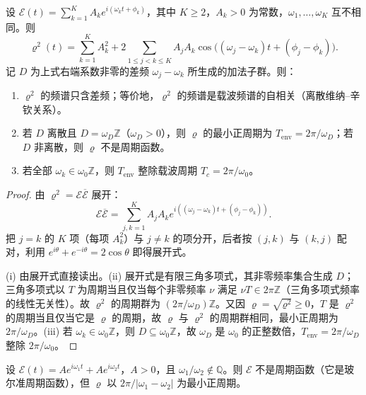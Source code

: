 \begin{theorem}[差频展开]\label{thm:dyn_envelope_difference}
设 $\mathcal E(t)=\sum_{k=1}^{K}A_ke^{i(\omega_kt+\phi_k)}$，其中 $K\ge2$，$A_k>0$ 为常数，$\omega_1,\dots,\omega_K$ 互不相同。则
\[
\varrho^2(t)=\sum_{k=1}^{K}A_k^2+2\sum_{1\le j<k\le K}A_jA_k\cos\bigl((\omega_j-\omega_k)t+(\phi_j-\phi_k)\bigr).
\]
记 $D$ 为上式右端系数非零的差频 $\omega_j-\omega_k$ 所生成的加法子群。则：
\begin{enumerate}[label=(\roman*)]
    \item $\varrho^2$ 的频谱只含差频；等价地，$\varrho^2$ 的频谱是载波频谱的自相关（离散维纳--辛钦关系）。
    \item 若 $D$ 离散且 $D=\omega_D\mathbb Z$（$\omega_D>0$），则 $\varrho$ 的最小正周期为 $T_{\text{env}}=2\pi/\omega_D$；若 $D$ 非离散，则 $\varrho$ 不是周期函数。
    \item 若全部 $\omega_k\in\omega_0\mathbb Z$，则 $T_{\text{env}}$ 整除载波周期 $T_c=2\pi/\omega_0$。
\end{enumerate}
\end{theorem}

\begin{proof}
由 $\varrho^2=\mathcal E\overline{\mathcal E}$ 展开：
\[
\mathcal E\overline{\mathcal E}=\sum_{j,k=1}^{K}A_jA_k e^{i((\omega_j-\omega_k)t+(\phi_j-\phi_k))}.
\]
把 $j=k$ 的 $K$ 项（每项 $A_k^2$）与 $j\ne k$ 的项分开，后者按 $(j,k)$ 与 $(k,j)$ 配对，利用 $e^{i\theta}+e^{-i\theta}=2\cos\theta$ 即得展开式。

(i) 由展开式直接读出。(ii) 展开式是有限三角多项式，其非零频率集合生成 $D$；三角多项式以 $T$ 为周期当且仅当每个非零频率 $\nu$ 满足 $\nu T\in2\pi\mathbb Z$（三角多项式频率的线性无关性）。故 $\varrho^2$ 的周期群为 $(2\pi/\omega_D)\mathbb Z$。又因 $\varrho=\sqrt{\varrho^2}\ge0$，$T$ 是 $\varrho^2$ 的周期当且仅当它是 $\varrho$ 的周期，故 $\varrho$ 与 $\varrho^2$ 的周期群相同，最小正周期为 $2\pi/\omega_D$。(iii) 若 $\omega_k\in\omega_0\mathbb Z$，则 $D\subseteq\omega_0\mathbb Z$，故 $\omega_D$ 是 $\omega_0$ 的正整数倍，$T_{\text{env}}=2\pi/\omega_D$ 整除 $2\pi/\omega_0$。
\end{proof}

\begin{corollary}[准周期载波可以有周期包络]\label{cor:dyn_envelope_quasiperiodic}
设 $\mathcal E(t)=Ae^{i\omega_1t}+Ae^{i\omega_2t}$，$A>0$，且 $\omega_1/\omega_2\notin\mathbb Q$。则 $\mathcal E$ 不是周期函数（它是玻尔准周期函数），但 $\varrho$ 以 $2\pi/|\omega_1-\omega_2|$ 为最小正周期。
\end{corollary}

